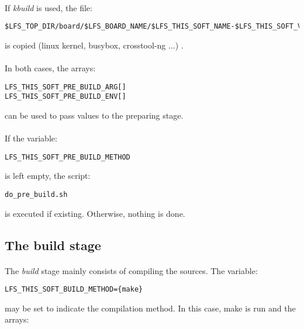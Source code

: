\documentclass[a4paper, 11pt]{article}
\begin{document}
\paragraph{}
If \textit{kbuild} is used, the file:\\

\begin{small}
\begin{lstlisting}[frame=tb]
$LFS_TOP_DIR/board/$LFS_BOARD_NAME/$LFS_THIS_SOFT_NAME-$LFS_THIS_SOFT_VERS.config
\end{lstlisting}
\end{small}
is copied (linux kernel, busybox, crosstool-ng ...) .

\paragraph{}
In both cases, the arrays:\\

\begin{lstlisting}[frame=tb]
LFS_THIS_SOFT_PRE_BUILD_ARG[]
LFS_THIS_SOFT_PRE_BUILD_ENV[]
\end{lstlisting}
can be used to pass values to the preparing stage.

\paragraph{}
If the variable:\\

\begin{lstlisting}[frame=tb]
LFS_THIS_SOFT_PRE_BUILD_METHOD
\end{lstlisting}
is left empty, the script:\\
\begin{lstlisting}[frame=tb]
do_pre_build.sh
\end{lstlisting}
is executed if existing. Otherwise, nothing is done.

\subsection{The build stage}
\paragraph{}
The \textit{build} stage mainly consists of compiling the sources. The variable:\\

\begin{lstlisting}[frame=tb]
LFS_THIS_SOFT_BUILD_METHOD={make}
\end{lstlisting}
may be set to indicate the compilation method. In this case, make is run and the
arrays:\\
\end{document}
